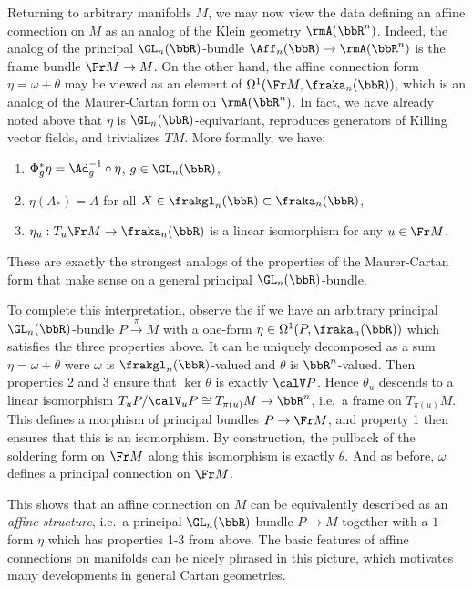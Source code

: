 \begin{rem}\label{rem 1.3.6 Cap}
    Returning to arbitrary manifolds $M$, we may now view the data defining an affine connection on $M$ as an analog of the Klein geometry $\rmA(\bbR^n)$. Indeed, the analog of the principal $\GL_n(\bbR)$-bundle $\Aff_n(\bbR)\to \rmA(\bbR^n)$ is the frame bundle $\Fr M\to M$. On the other hand, the affine connection form $\eta=\omega+\theta$ may be viewed as an element of $\Omega^1(\Fr M,\fraka_n(\bbR))$, which is an analog of the Maurer-Cartan form on $\rmA(\bbR^n)$. In fact, we have already noted above that $\eta$ is $\GL_n(\bbR)$-equivariant, reproduces generators of Killing vector fields, and trivializes $TM$. More formally, we have:
    \begin{enumerate}
        \item $\Phi_g^\ast \eta=\Ad_g^{-1}\circ \eta$, $g\in\GL_n(\bbR)$,
        \item $\eta(A_\ast)=A$ for all $X\in\frakgl_n(\bbR)\subset\fraka_n(\bbR)$,
        \item $\eta_u:T_u\Fr M\to \fraka_n(\bbR)$ is a linear isomorphism for any $u\in\Fr M$.
    \end{enumerate}
    These are exactly the strongest analogs of the properties of the Maurer-Cartan form that make sense on a general principal $\GL_n(\bbR)$-bundle.

    To complete this interpretation, observe the if we have an arbitrary principal $\GL_n(\bbR)$-bundle $P\overset{\pi}{\to}M$ with a one-form $\eta\in\Omega^1(P,\fraka_n(\bbR))$ which satisfies the three properties above. It can be uniquely decomposed as a sum $\eta=\omega+\theta$ were $\omega$ is $\frakgl_n(\bbR)$-valued and $\theta$ is $\bbR^n$-valued. Then properties 2 and 3 ensure that $\ker\theta$ is exactly $\calV P$. Hence $\theta_u$ descends to a linear isomorphism $T_u P\slash \calV_u P\cong T_{\pi(u)}M\to \bbR^n$, i.e.\ a frame on $T_{\pi(u)}M$. This defines a morphism of principal bundles $P\to \Fr M$, and property 1 then ensures that this is an isomorphism. By construction, the pullback of the soldering form on $\Fr M$ along this isomorphism is exactly $\theta$. And as before, $\omega$ defines a principal connection on $\Fr M$.

    This shows that an affine connection on $M$ can be equivalently described as an \emph{affine structure}, i.e.\ a principal $\GL_n(\bbR)$-bundle $P\to M$ together with a $1$-form $\eta$ which has properties 1-3 from above. The basic features of affine connections on manifolds can be nicely phrased in this picture, which motivates many developments in general Cartan geometries.
\end{rem}



